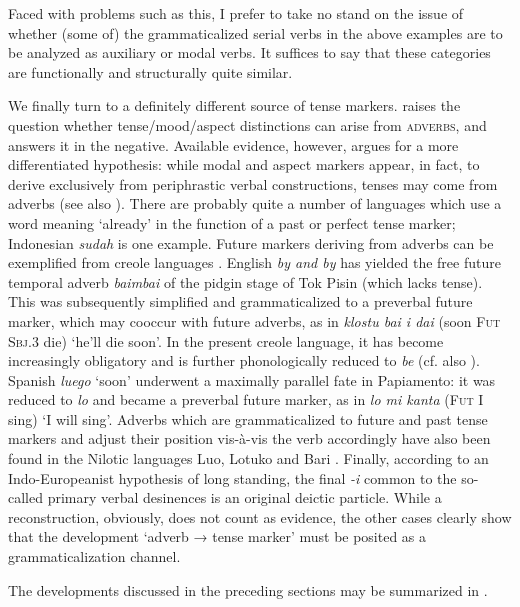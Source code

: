 Faced with problems such as this, I prefer to take no stand on the issue of whether (some of) the grammaticalized serial verbs in the above examples are to be analyzed as auxiliary or modal verbs. It suffices to say that these categories are functionally and structurally quite similar.

We finally turn to a definitely different source of tense markers. \citet[218f]{Givón1979a} raises the question whether tense/mood/aspect distinctions can arise from \textsc{adverbs}, and answers it in the negative. Available evidence, however, argues for a more differentiated hypothesis: while modal and aspect markers appear, in fact, to derive exclusively from periphrastic verbal constructions, tenses may come from adverbs (see also \citealt[Ch. 3.1.1.3]{HeineEtAl1984}). There are probably quite a number of languages which use a word meaning ‘already’ in the function of a past or perfect tense marker; Indonesian \textit{sudah} is one example. Future markers deriving from adverbs can be exemplified from creole languages \citep{Labov1971}. English \textit{by and by} has yielded the free future temporal adverb \textit{baimbai} of the pidgin stage of Tok Pisin (which lacks tense). This was subsequently simplified and grammaticalized to a preverbal future marker, which may cooccur with future adverbs, as in \textit{klostu bai i dai} (soon \textsc{Fut} \textsc{Sbj}.3 die) ‘he'll die soon’. In the present creole language, it has become increasingly obligatory and is further phonologically reduced to \textit{be} (cf. also \citealt{SankoffEtAl1974}). Spanish \textit{luego} ‘soon’ underwent a maximally parallel fate in Papiamento: it was reduced to \textit{lo} and became a preverbal future marker, as in \textit{lo mi kanta} (\textsc{Fut} I sing) ‘I will sing’.\label{page39b} Adverbs which are grammaticalized to future and past tense markers and adjust their position vis-à-vis the verb accordingly have also been found in the Nilotic languages Luo, Lotuko and Bari \citep[130, 132]{HeineEtAl1984}.\label{page39} Finally, according to an Indo-Europeanist hypothesis of long standing, the final \textit{{}-i} common to the so-called primary verbal desinences is an original deictic particle. While a reconstruction, obviously, does not count as evidence, the other cases clearly show that the development ‘adverb → tense marker’ must be posited as a grammaticalization channel.

The developments discussed in the preceding sections may be summarized in .

